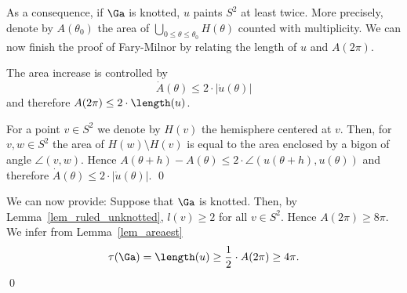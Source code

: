 As a consequence, if $\Ga$ is knotted, $u$ paints $S^2$ at least twice.
More precisely, denote by $A(\theta_0)$ the area of
$\bigcup_{0\leq\theta\leq\theta_0}H(\theta)$ counted with multiplicity.
We can now finish the proof of Fary-Milnor by relating the length of $u$ and $A(2\pi)$.

\blem\label{lem_areaest}
The area increase is controlled by 
\[\dot A(\theta)\leq 2\cdot|\dot u(\theta)|\] 
and therefore $ A(2\pi)\leq 2\cdot\length(u)$.
\elem 

\proof
For a point $v\in S^2$ we denote by $H(v)$ the hemisphere centered at $v$.
Then, for $v,w\in S^2$ the area of $H(w)\setminus H(v)$ is equal to the area enclosed by a bigon of angle $\angle(v,w)$.
Hence $A(\theta+h)-A(\theta)\leq 2\cdot\angle (u(\theta+h),u(\theta))$ and therefore $\dot A(\theta)\leq 2\cdot|\dot u(\theta)|$.
\qed
\medskip

We can now provide:
Suppose that $\Ga$ is knotted. Then, by Lemma~\ref{lem_ruled_unknotted}, $l(v)\geq 2$ for all $v\in S^2$.
Hence $A(2\pi)\geq 8\pi$. We infer from Lemma~\ref{lem_areaest} 
\[\tau(\Ga)=\length(u)\geq \frac{1}{2}\cdot A(2\pi)\geq 4\pi.\]
\qed
